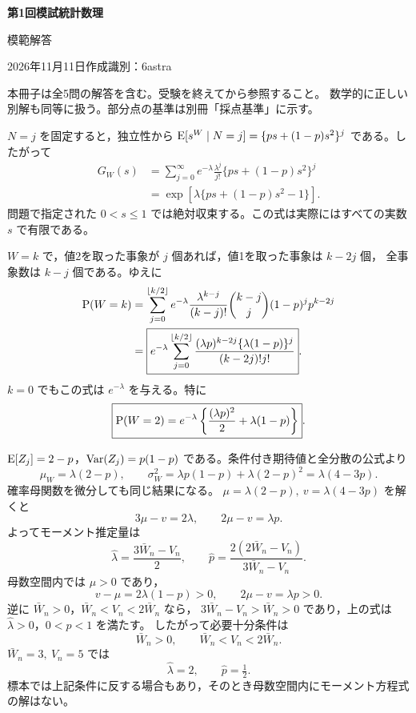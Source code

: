 \documentclass[a4paper,11pt]{ltjsarticle}
\begin{document}
\begin{center}
{\LARGE\bfseries 第1回模試\quad 統計数理}\par\medskip
{\Large 模範解答}\par\medskip
2026年11月11日\quad 作成識別：6astra
\end{center}
\noindent 本冊子は全5問の解答を含む。受験を終えてから参照すること。
数学的に正しい別解も同等に扱う。部分点の基準は別冊「採点基準」に示す。

$N=j$ を固定すると，独立性から
$\operatorname{E}[s^W\mid N=j]=\{ps+(1-p)s^2\}^{j}$ である。したがって
\begin{align*}
G_W(s)
&=\sum_{j=0}^{\infty}e^{-\lambda}\frac{\lambda^j}{j!}
  \{ps+(1-p)s^2\}^{j}\\
&=\boxed{\exp\!\left[\lambda\{ps+(1-p)s^2-1\}\right]}.
\end{align*}
問題で指定された $0<s\leq1$ では絶対収束する。この式は実際にはすべての実数 $s$ で有限である。

$W=k$ で，値2を取った事象が $j$ 個あれば，値1を取った事象は $k-2j$ 個，
全事象数は $k-j$ 個である。ゆえに
\begin{align*}
\operatorname{P}(W=k)
&=\sum_{j=0}^{\lfloor k/2\rfloor}
 e^{-\lambda}\frac{\lambda^{k-j}}{(k-j)!}
 \binom{k-j}{j}(1-p)^jp^{k-2j}\\
&=\boxed{e^{-\lambda}\sum_{j=0}^{\lfloor k/2\rfloor}
\frac{(\lambda p)^{k-2j}\{\lambda(1-p)\}^{j}}
{(k-2j)!j!}}.
\end{align*}
$k=0$ でもこの式は $e^{-\lambda}$ を与える。特に
\[
\boxed{\operatorname{P}(W=2)=e^{-\lambda}\left\{\frac{(\lambda p)^2}{2}+\lambda(1-p)\right\}}.
\]

$\operatorname{E}[Z_j]=2-p$，$\operatorname{Var}(Z_j)=p(1-p)$ である。条件付き期待値と全分散の公式より
\[
\boxed{\mu_W=\lambda(2-p)},\qquad
\sigma_W^2=\lambda p(1-p)+\lambda(2-p)^2
=\boxed{\lambda(4-3p)}.
\]
確率母関数を微分しても同じ結果になる。
\newpage
{}
$\mu=\lambda(2-p),\ v=\lambda(4-3p)$ を解くと
\[
3\mu-v=2\lambda,\qquad
2\mu-v=\lambda p.
\]
よってモーメント推定量は
\[
\boxed{\hat\lambda=\frac{3\bar W_n-V_n}{2}},\qquad
\boxed{\hat p=\frac{2(2\bar W_n-V_n)}{3\bar W_n-V_n}}.
\]
母数空間内では $\mu>0$ であり，
\[
v-\mu=2\lambda(1-p)>0,\qquad 2\mu-v=\lambda p>0.
\]
逆に $\bar W_n>0$，$\bar W_n<V_n<2\bar W_n$ なら，
$3\bar W_n-V_n>\bar W_n>0$ であり，上の式は $\hat\lambda>0$，$0<\hat p<1$ を満たす。
したがって必要十分条件は
\[
\boxed{\bar W_n>0,\qquad \bar W_n<V_n<2\bar W_n}.
\]
$\bar W_n=3,\ V_n=5$ では
\[
\boxed{\hat\lambda=2,\qquad\hat p=\tfrac12}.
\]
標本では上記条件に反する場合もあり，そのとき母数空間内にモーメント方程式の解はない。
\end{document}
